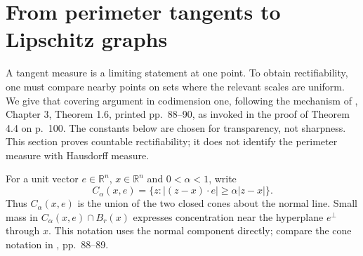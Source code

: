 \chapter{From perimeter tangents to Lipschitz graphs}\label{sec:perimeter-graph-cover}
A tangent measure is a limiting statement at one point. To obtain rectifiability, one must compare nearby points on sets where the relevant scales are uniform. We give that covering argument in codimension one, following the mechanism of \cite{Sim18}, Chapter 3, Theorem 1.6, printed pp.~88--90, as invoked in the proof of Theorem 4.4 on p.~100. The constants below are chosen for transparency, not sharpness. This section proves countable rectifiability; it does not identify the perimeter measure with Hausdorff measure.

\begin{definition}\label{def:normal-double-cone}
For a unit vector $e\in\mathbb R^n$, $x\in\mathbb R^n$ and $0<\alpha<1$, write
\[
 C_\alpha(x,e)=\{z:|(z-x)\cdot e|\geq\alpha|z-x|\}.
\]
Thus $C_\alpha(x,e)$ is the union of the two closed cones about the normal line. Small mass in $C_\alpha(x,e)\cap B_r(x)$ expresses concentration near the hyperplane $e^\perp$ through $x$. This notation uses the normal component directly; compare the cone notation in \cite{Sim18}, pp.~88--89.
\end{definition}

